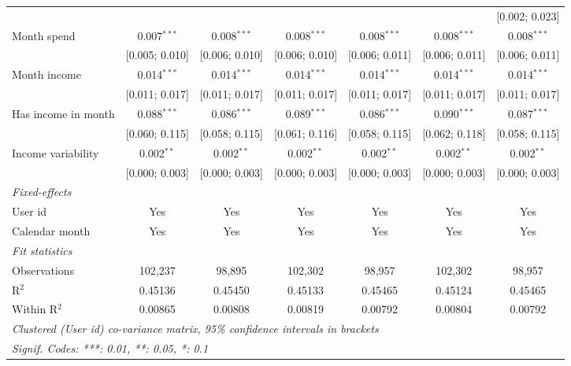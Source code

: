 \begin{table}[htbp]
\begin{threeparttable}[b]
\begin{tabular}{lcccccc}
                                         &                &                &                &                &                & [0.002; 0.023]\\   
         Month spend                     & 0.007$^{***}$  & 0.008$^{***}$  & 0.008$^{***}$  & 0.008$^{***}$  & 0.008$^{***}$  & 0.008$^{***}$\\   
                                         & [0.005; 0.010] & [0.006; 0.010] & [0.006; 0.010] & [0.006; 0.011] & [0.006; 0.011] & [0.006; 0.011]\\   
         Month income                    & 0.014$^{***}$  & 0.014$^{***}$  & 0.014$^{***}$  & 0.014$^{***}$  & 0.014$^{***}$  & 0.014$^{***}$\\   
                                         & [0.011; 0.017] & [0.011; 0.017] & [0.011; 0.017] & [0.011; 0.017] & [0.011; 0.017] & [0.011; 0.017]\\   
         Has income in month             & 0.088$^{***}$  & 0.086$^{***}$  & 0.089$^{***}$  & 0.086$^{***}$  & 0.090$^{***}$  & 0.087$^{***}$\\   
                                         & [0.060; 0.115] & [0.058; 0.115] & [0.061; 0.116] & [0.058; 0.115] & [0.062; 0.118] & [0.058; 0.115]\\   
         Income variability              & 0.002$^{**}$   & 0.002$^{**}$   & 0.002$^{**}$   & 0.002$^{**}$   & 0.002$^{**}$   & 0.002$^{**}$\\   
                                         & [0.000; 0.003] & [0.000; 0.003] & [0.000; 0.003] & [0.000; 0.003] & [0.000; 0.003] & [0.000; 0.003]\\   
         \midrule
         \emph{Fixed-effects}\\
         User id                         & Yes            & Yes            & Yes            & Yes            & Yes            & Yes\\  
         Calendar month                  & Yes            & Yes            & Yes            & Yes            & Yes            & Yes\\  
         \midrule
         \emph{Fit statistics}\\
         Observations                    & 102,237        & 98,895         & 102,302        & 98,957         & 102,302        & 98,957\\  
         R$^2$                           & 0.45136        & 0.45450        & 0.45133        & 0.45465        & 0.45124        & 0.45465\\  
         Within R$^2$                    & 0.00865        & 0.00808        & 0.00819        & 0.00792        & 0.00804        & 0.00792\\  
         \midrule \midrule
         \multicolumn{7}{l}{\emph{Clustered (User id) co-variance matrix, 95\% confidence intervals in brackets}}\\
         \multicolumn{7}{l}{\emph{Signif. Codes: ***: 0.01, **: 0.05, *: 0.1}}\\
      \end{tabular}
   \end{threeparttable}
\end{table}


